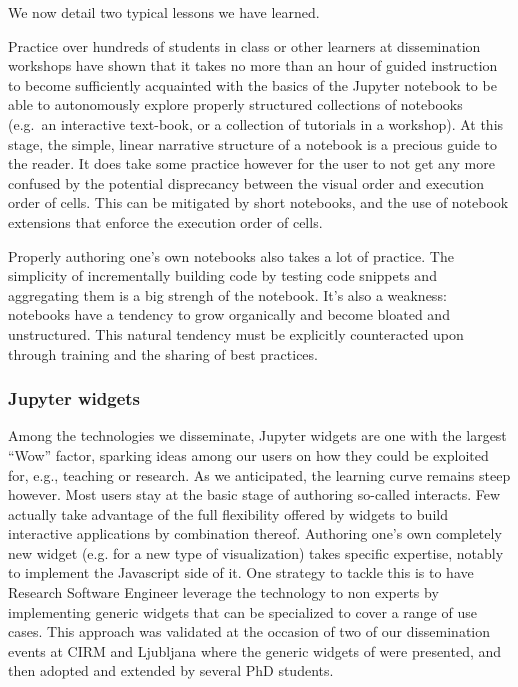 \documentclass{deliverablereport}
\begin{document}
We now detail two typical lessons we have learned.

Practice over hundreds of students in class or other learners at
dissemination workshops have shown that it takes no more than an hour of
guided instruction to become sufficiently acquainted with the basics of
the Jupyter notebook to be able to autonomously explore properly
structured collections of notebooks (e.g.~an interactive text-book, or a
collection of tutorials in a workshop). At this stage, the simple,
linear narrative structure of a notebook is a precious guide to the
reader.
It does take some practice however for the user to not get any more
confused by the potential disprecancy between the visual order and
execution order of cells. This can be mitigated by short notebooks, and
the use of notebook extensions that enforce the execution order of
cells.

Properly authoring one's own notebooks also takes a lot of practice.
The simplicity of incrementally building code by testing code snippets
and aggregating them is a big strengh of the notebook. It's also a
weakness: notebooks have a tendency to grow organically and become
bloated and unstructured. This natural tendency must be explicitly
counteracted upon through training and the sharing of best practices.

\subsubsection{Jupyter widgets}

Among the technologies we disseminate, Jupyter widgets are one with
the largest ``Wow'' factor, sparking ideas among our users on how they
could be exploited for, e.g., teaching or research. As we anticipated,
the learning curve remains steep however. Most users stay at the basic
stage of authoring so-called interacts. Few actually take advantage of
the full flexibility offered by widgets to build interactive
applications by combination thereof. Authoring one's own completely
new widget (e.g. for a new type of visualization) takes specific
expertise, notably to implement the Javascript side of it. One
strategy to tackle this is to have Research Software Engineer leverage
the technology to non experts by implementing generic widgets that can
be specialized to cover a range of use cases. This approach was
validated at the occasion of two of our dissemination events at CIRM
and Ljubljana where the generic widgets of
 were presented, and then
adopted and extended by several PhD students.
\end{document}
